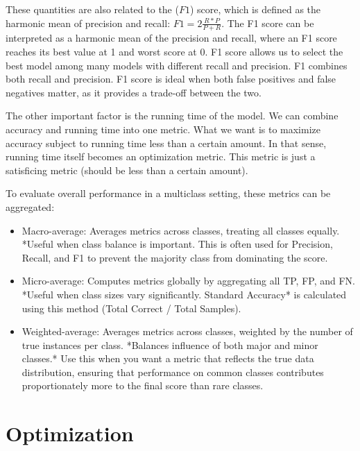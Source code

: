 \documentclass[12pt]{report}
\begin{document}
These quantities are also related to the ($F1$) score, which is defined as the harmonic mean of precision and recall: $F1 = 2 \frac{R * P}{ P + R } $. The F1 score can be interpreted as a harmonic mean of the precision and recall, where an F1 score reaches its best value at 1 and worst score at 0. F1 score allows us to select the best model among many models with different recall and precision. F1 combines both recall and precision. F1 score is ideal when both false positives and false negatives matter, as it provides a trade-off between the two.

The other important factor is the running time of the model. We can combine accuracy and running time into one metric. What we want is to maximize accuracy subject to running time less than a certain amount. In that sense, running time itself becomes an optimization metric. This metric is just a satisficing metric (should be less than a certain amount).


To evaluate overall performance in a multiclass setting, these metrics can be aggregated:

\begin{itemize}
\item Macro-average:
Averages metrics across classes, treating all classes equally. *Useful when class balance is important.
This is often used for Precision, Recall, and F1 to prevent the majority class from dominating the score.

\item Micro-average:
Computes metrics globally by aggregating all TP, FP, and FN. *Useful when class sizes vary significantly.
Standard Accuracy* is calculated using this method (Total Correct / Total Samples).

\item Weighted-average:
Averages metrics across classes, weighted by the number of true instances per class. *Balances influence of both major and minor classes.*
Use this when you want a metric that reflects the true data distribution, ensuring that performance on common classes contributes proportionately more to the final score than rare classes.
\end{itemize}













\section{Optimization}
\end{document}
